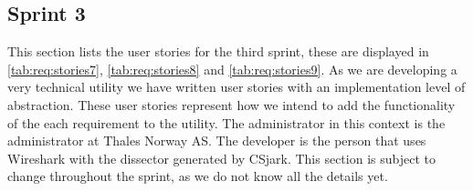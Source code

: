 \subsection{Sprint 3}
This section lists the user stories for the third sprint, these are displayed in \autoref{tab:req:stories7}, \autoref{tab:req:stories8} and \autoref{tab:req:stories9}.
As we are developing a very technical utility we have written user stories with an implementation level of abstraction. 
These user stories represent how we intend to add the functionality of the each requirement to the utility.
The administrator in this context is the administrator at Thales Norway AS. 
The developer is the person that uses Wireshark with the dissector generated by CSjark.
This section is subject to change throughout the sprint, as we do not know all the details yet.


